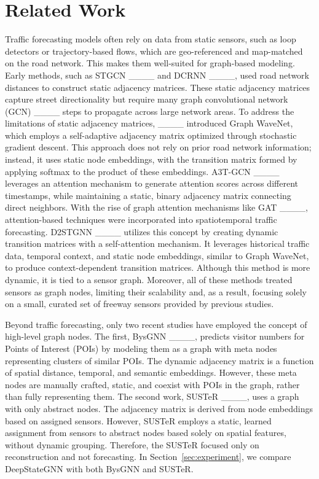 \section{Related Work}
\label{sec:related-work}
Traffic forecasting models often rely on data from static sensors, such as loop detectors or trajectory-based flows, which are geo-referenced and map-matched on the road network. This makes them well-suited for graph-based modeling. Early methods, such as STGCN ____ and DCRNN ____, used road network distances to construct static adjacency matrices. 
These static adjacency matrices capture street directionality but require many graph convolutional network (GCN) ____ steps to propagate across large network areas.
To address the limitations of static adjacency matrices, ____ introduced Graph WaveNet, which employs a self-adaptive adjacency matrix optimized through stochastic gradient descent. 
This approach does not rely on prior road network information; instead, it uses static node embeddings, with the transition matrix formed by applying softmax to the product of these embeddings.
A3T-GCN ____ leverages an attention mechanism to generate attention scores across different timestamps, while maintaining a static, binary adjacency matrix connecting direct neighbors.
With the rise of graph attention mechanisms like GAT ____, attention-based techniques were incorporated into spatiotemporal traffic forecasting. 
D2STGNN ____ utilizes this concept by creating dynamic transition matrices with a self-attention mechanism. It leverages historical traffic data, temporal context, and static node embeddings, similar to Graph WaveNet, to produce context-dependent transition matrices. Although this method is more dynamic, it is tied to a sensor graph.
Moreover, all of these methods treated sensors as graph nodes, limiting their scalability and, as a result, focusing solely on a small, curated set of freeway sensors provided by previous studies.

Beyond traffic forecasting, only two recent studies have employed the concept of high-level graph nodes. The first, BysGNN ____, predicts visitor numbers for Points of Interest (POIs) by modeling them as a graph with meta nodes representing clusters of similar POIs. The dynamic adjacency matrix is a function of spatial distance, temporal, and semantic embeddings. However, these meta nodes are manually crafted, static, and coexist with POIs in the graph, rather than fully representing them.
The second work, SUSTeR ____, uses a graph with only abstract nodes. The adjacency matrix is derived from node embeddings based on assigned sensors. However, SUSTeR employs a static, learned assignment from sensors to abstract nodes based solely on spatial features, without dynamic grouping.
Therefore, the SUSTeR focused only on reconstruction and not forecasting. In Section~\ref{sec:experiment}, we compare DeepStateGNN with both BysGNN and SUSTeR.


